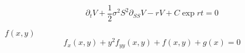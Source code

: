 \begin{equation}
	\partial_t V + \frac{1}{2}\sigma^2 S^2 \partial_{SS}V -r V + C\exp{rt}= 0
\end{equation}

$f(x,y)$
\begin{equation}
	f_x(x,y) + y^2 f_{yy}(x,y) + f(x,y) + g(x) = 0
\end{equation}